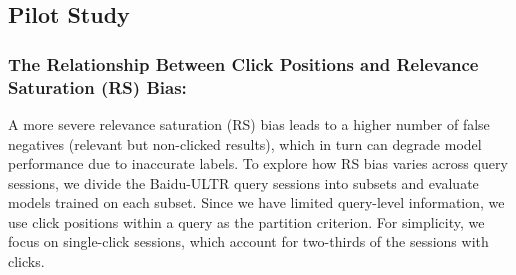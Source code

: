 \subsection{Pilot Study}
\label{data_ref}


\subsubsection{The Relationship Between Click Positions and Relevance Saturation (RS) Bias:} A more severe relevance saturation (RS) bias leads to a higher number of false negatives (relevant but non-clicked results), which in turn can degrade model performance due to inaccurate labels. To explore how RS bias varies across query sessions, we divide the Baidu-ULTR query sessions into subsets and evaluate models trained on each subset. Since we have limited query-level information, we use click positions within a query as the partition criterion. For simplicity, we focus on single-click sessions, which account for two-thirds of the sessions with clicks. 

